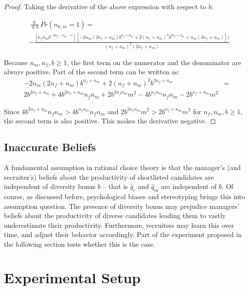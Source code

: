 \documentclass[11pt]{article}
\DeclareMathOperator{\di}{d\!}
\begin{document}
\begin{proof}
    Taking the derivative of the above expression with respect to $b$:

    \begin{align*}
         & \frac{\di}{\di b} Pr(n_{h,m}=1) =                                                                                                         \\
         & -\frac{[n_f n_m b^{-3 n_f-n_m-1}] [-2 n_m (2 n_f+n_m) b^{n_f+n_m}+2 (n_f+n_m)^2 b^{2 n_f+n_m}+n_m (3 n_f+n_m)])}{(n_f+n_m)^2 (2 n_f+n_m)}
    \end{align*}

    Because $n_m, n_f, b \geq 1$, the first term on the numerator and the denominator are always positive. Part of the second term can be written as:
    \begin{align*}
        -2 n_m (2 n_f+n_m) b^{n_f+n_m}+2 (n_f+n_m)^2 b^{2 n_f+n_m} & = \\
        2b^{2n_f+n_m} + 4b^{2n_f+n_m} n_f n_m + 2b^{2n_fn_m} m^2 - 4b^{n_fn_m}n_fn_m - 2b^{n_f+n_m}m^2
    \end{align*}

    Since $4b^{2n_f+n_m} n_f n_m > 4b^{n_fn_m}n_fn_m$ and $2b^{2n_fn_m} m^2 > 2b^{n_f+n_m}m^2$ for $n_f,n_m,b \geq 1$, the second term is also positive. This makes the derivative negative.
\end{proof}

\subsection{Inaccurate Beliefs}

A fundamental assumption in rational choice theory is that the manager's (and recruiter's) beliefs about the productivity of shortlisted candidates are independent of diversity bonus $b$ -- that is $\hat{q}_r$ and $\hat{q}_m$ are independent of $b$. Of course, as discussed before, psychological biases and stereotyping brings this into assumption question. The presence of diversity bonus may prejudice managers' beliefs about the productivity of diverse candidates leading them to vastly underestimate their productivity. Furthermore, recruiters may learn this over time, and adjust their behavior accordingly.  Part of the experiment proposed in the following section tests whether this is the case.

\section{Experimental Setup}
\end{document}
